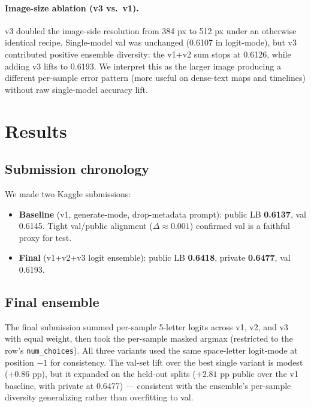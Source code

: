 \documentclass[11pt]{article}
\begin{document}
\paragraph{Image-size ablation (v3 vs.\ v1).} v3 doubled the image-side resolution from 384 px to 512 px under an otherwise identical recipe. Single-model val was unchanged (0.6107 in logit-mode), but v3 contributed positive ensemble diversity: the v1+v2 sum stops at 0.6126, while adding v3 lifts to 0.6193. We interpret this as the larger image producing a different per-sample error pattern (more useful on dense-text maps and timelines) without raw single-model accuracy lift.

\section{Results}

\subsection{Submission chronology}

We made two Kaggle submissions:

\begin{itemize}
    \item \textbf{Baseline} (v1, generate-mode, drop-metadata prompt): public LB \textbf{0.6137}, val 0.6145. Tight val/public alignment ($\Delta\!\approx\!0.001$) confirmed val is a faithful proxy for test.
    \item \textbf{Final} (v1+v2+v3 logit ensemble): public LB \textbf{0.6418}, private \textbf{0.6477}, val 0.6193.
\end{itemize}

\subsection{Final ensemble}

The final submission summed per-sample 5-letter logits across v1, v2, and v3 with equal weight, then took the per-sample masked argmax (restricted to the row's \texttt{num\_choices}). All three variants used the same space-letter logit-mode at position $-1$ for consistency. The val-set lift over the best single variant is modest ($+0.86$ pp), but it expanded on the held-out splits ($+2.81$ pp public over the v1 baseline, with private at 0.6477) --- consistent with the ensemble's per-sample diversity generalizing rather than overfitting to val.
\end{document}

